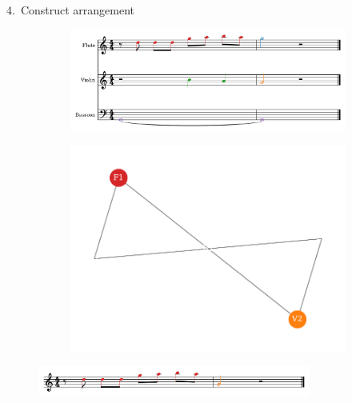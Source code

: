 \documentclass[handout]{beamer}
\begin{document}
\begin{frame}{4.\ Construct arrangement}
    \begin{figure}
        \begin{subfigure}{0.6\linewidth}
            \includegraphics[width=0.9\linewidth]{../Figures/toy-1.png}
        \end{subfigure}\hfill
        \begin{subfigure}{0.4\linewidth}
            \includegraphics[width=0.9\linewidth]{../Figures/toy_solution.pdf}
        \end{subfigure}
    \end{figure}
    \pause
    \centering
    \begin{figure}
        \includegraphics[width=0.8\textwidth]{../Figures/toy_arrangement-1.png}
    \end{figure}

\end{frame}
\end{document}

